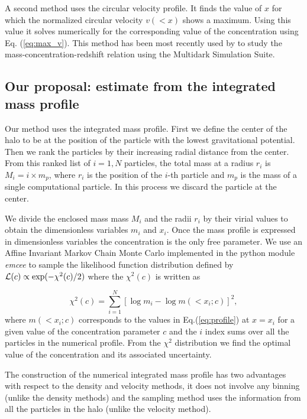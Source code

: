 \documentclass[a4,useAMS,usenatbib,usegraphicx]{mn2e}
\begin{document}
A second method uses the circular velocity profile.  
It finds the value of $x$ for which the normalized circular velocity
$v(<x)$ shows a maximum.  
Using this value it solves numerically for the corresponding value of
the concentration using Eq. (\ref{eq:max_v}). 
This method has been most recently used by \cite{Klypin2014} to study
the mass-concentration-redshift relation using the Multidark
Simulation Suite. 


\subsection{Our proposal: estimate from the integrated mass profile}

Our method uses the integrated mass profile.  
First we define the center of the halo to be at the position of the
particle with the lowest gravitational potential.  
Then we rank the particles by their increasing radial distance from
the center. 
From this ranked list of $i=1,N$ particles, the total mass at a radius
$r_i$ is $M_i=i\times m_p$, where $r_i$ is the position of the $i$-th
particle and $m_p$ is the mass of a single computational particle. In
this process we discard the particle at the center. 

We divide the enclosed mass mass $M_i$ and the radii $r_i$ by their
virial values to obtain the dimensionless variables $m_i$ and $x_i$.
Once the mass profile is expressed in dimensionless variables the
concentration is the only free parameter. 
We use an Affine Invariant Markov Chain Monte Carlo implemented in the
python module {\em emcee} \citep{emcee} to sample the likelihood
function distribution defined by ${\cal L}(c)\propto
\exp(-\chi^2(c)/2)$ where the $\chi^2(c)$ is 
written as

\begin{equation}
\chi^2(c)= \sum_{i=1}^{N}[\log m_i - \log m(< x_i;c)]^2,
\end{equation}
%
where $m(<x_i;c)$ corresponds to the values in Eq.(\ref{eq:profile})
at $x=x_i$ for a given value of the concentration parameter $c$ and
the $i$ index sums over all the particles in the numerical profile.
From the $\chi^2$ distribution we find the optimal value of the
concentration and its associated uncertainty.

The construction of the numerical integrated mass profile has two
advantages with respect to the density and velocity methods, it does
not involve any binning (unlike the density methods) and the sampling
method uses the information from all the particles in the halo (unlike
the velocity method).
\end{document}
